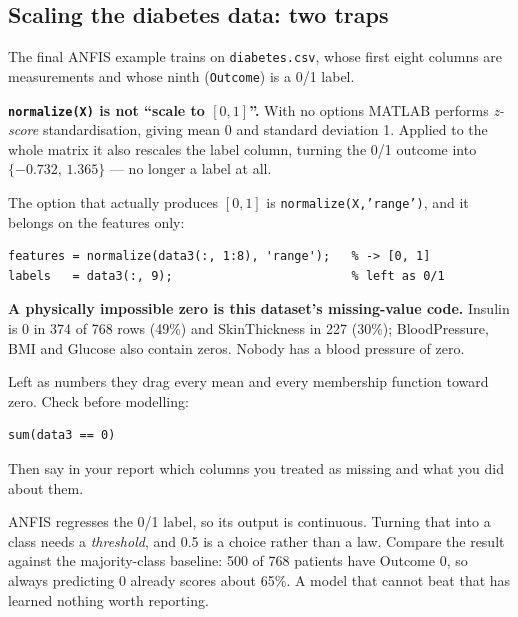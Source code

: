 \subsection{Scaling the diabetes data: two traps}

The final ANFIS example trains on \texttt{diabetes.csv}, whose first eight columns are measurements and whose ninth (\texttt{Outcome}) is a 0/1 label.

\begin{pitfall}
\textbf{\texttt{normalize(X)} is not ``scale to \([0,1]\)''.} With no options MATLAB performs \emph{z-score} standardisation, giving mean 0 and standard deviation 1. Applied to the whole matrix it also rescales the label column, turning the 0/1 outcome into \(\{-0.732,\,1.365\}\) --- no longer a label at all.

The option that actually produces \([0,1]\) is \texttt{normalize(X,'range')}, and it belongs on the features only:

\begin{lstlisting}[style=mlmatlab]
features = normalize(data3(:, 1:8), 'range');   % -> [0, 1]
labels   = data3(:, 9);                         % left as 0/1
\end{lstlisting}
\end{pitfall}

\begin{pitfall}
\textbf{A physically impossible zero is this dataset's missing-value code.} Insulin is 0 in 374 of 768 rows (49\%) and SkinThickness in 227 (30\%); BloodPressure, BMI and Glucose also contain zeros. Nobody has a blood pressure of zero.

Left as numbers they drag every mean and every membership function toward zero. Check before modelling:

\begin{lstlisting}[style=mlmatlab]
sum(data3 == 0)
\end{lstlisting}

Then say in your report which columns you treated as missing and what you did about them.
\end{pitfall}

\begin{keyidea}
ANFIS regresses the 0/1 label, so its output is continuous. Turning that into a class needs a \emph{threshold}, and 0.5 is a choice rather than a law. Compare the result against the majority-class baseline: 500 of 768 patients have Outcome 0, so always predicting 0 already scores about 65\%. A model that cannot beat that has learned nothing worth reporting.
\end{keyidea}

